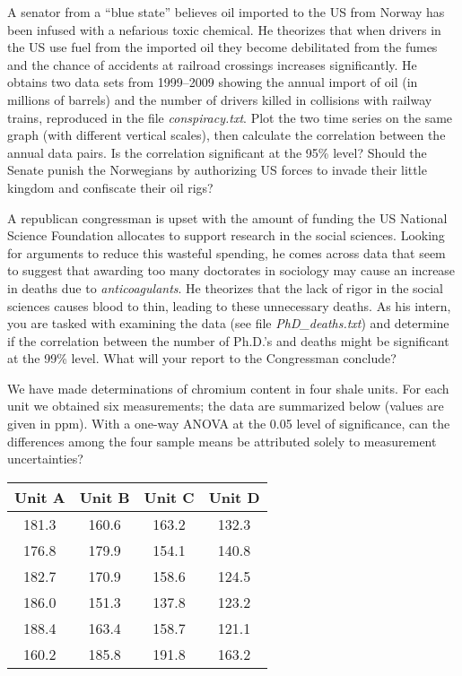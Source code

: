 \begin{problem}
A senator from a ``blue state'' believes oil imported to the US from Norway has been infused with a nefarious
toxic chemical.  He theorizes that when drivers in the US use fuel from the imported oil they
become debilitated from the fumes and the chance of accidents at railroad crossings increases significantly.
He obtains two data sets from 1999--2009 showing the annual import of oil (in millions of barrels) and the number of drivers
killed in collisions with railway trains, reproduced in the file \emph{conspiracy.txt}.  Plot the two time series
on the same graph (with different vertical scales), then calculate the correlation between
the annual data pairs.  Is the correlation significant at the 95\% level?  Should the Senate punish the
Norwegians by authorizing US forces to invade their little kingdom and confiscate their oil rigs?
\end{problem}

\begin{problem}
A republican congressman is upset with the amount of funding the US National Science Foundation allocates to
support research in the social sciences.  Looking for arguments to reduce this wasteful spending, he
comes across data that seem to suggest that awarding too many doctorates in sociology may cause an increase in deaths
due to \emph{anticoagulants}.  He theorizes that the lack of rigor in the social sciences causes blood to
thin, leading to these unnecessary deaths.  As his intern, you are tasked with examining the data (see file \emph{PhD\_deaths.txt})
and determine if the correlation between the number of Ph.D.'s and deaths might be significant at the 99\% level.
What will your report to the Congressman conclude?
\end{problem}

\begin{problem}
We have made determinations of chromium content in four shale units.  For each unit we obtained six measurements;
the data are summarized below (values are given in ppm).  With a one-way ANOVA at the 0.05 level of significance, can the
differences among the four sample means be attributed solely to measurement uncertainties?

\begin{table}[H]
\centering
\begin{tabular}{|c|c|c|c|} \hline
\bf{Unit A} & \bf{Unit B} & \bf{Unit C} & \bf{Unit D} \\ \hline
181.3 & 160.6 & 163.2 & 132.3 \\ \hline
176.8 & 179.9 & 154.1 & 140.8 \\ \hline
182.7 & 170.9 & 158.6 & 124.5 \\ \hline
186.0 & 151.3 & 137.8 & 123.2 \\ \hline
188.4 & 163.4 & 158.7 & 121.1 \\ \hline
160.2 & 185.8 & 191.8 & 163.2 \\ \hline
\end{tabular}
\end{table}
\end{problem}

